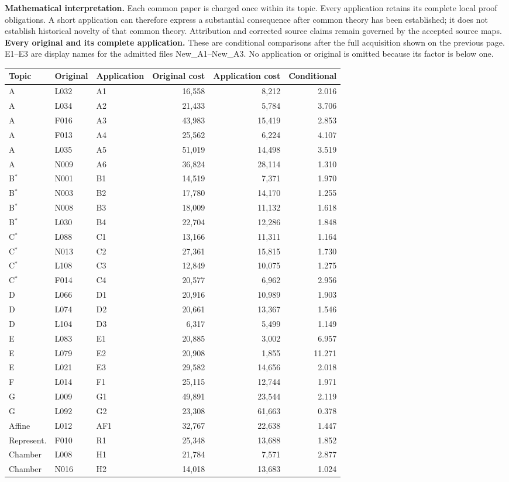 \documentclass[11pt,a4paper]{article}
\newcommand{\smalltable}{\small\setlength{\tabcolsep}{5pt}\renewcommand{\arraystretch}{1.13}}
\begin{document}
\textbf{Mathematical interpretation.} Each common paper is charged once within its topic. Every application retains its complete local proof obligations. A short application can therefore express a substantial consequence after common theory has been established; it does not establish historical novelty of that common theory. Attribution and corrected source claims remain governed by the accepted source maps.
\newpage
\textbf{Every original and its complete application.} These are conditional comparisons after the full acquisition shown on the previous page. E1--E3 are display names for the admitted files New\_A1--New\_A3. No application or original is omitted because its factor is below one.
\begin{center}\smalltable
\begin{tabular}{lllrrr}\toprule
Topic & Original & Application & Original cost & Application cost & Conditional\\\midrule
A & L032 & A1 & 16,558 & 8,212 & 2.016 \\
A & L034 & A2 & 21,433 & 5,784 & 3.706 \\
A & F016 & A3 & 43,983 & 15,419 & 2.853 \\
A & F013 & A4 & 25,562 & 6,224 & 4.107 \\
A & L035 & A5 & 51,019 & 14,498 & 3.519 \\
A & N009 & A6 & 36,824 & 28,114 & 1.310 \\
B$^*$ & N001 & B1 & 14,519 & 7,371 & 1.970 \\
B$^*$ & N003 & B2 & 17,780 & 14,170 & 1.255 \\
B$^*$ & N008 & B3 & 18,009 & 11,132 & 1.618 \\
B$^*$ & L030 & B4 & 22,704 & 12,286 & 1.848 \\
C$^*$ & L088 & C1 & 13,166 & 11,311 & 1.164 \\
C$^*$ & N013 & C2 & 27,361 & 15,815 & 1.730 \\
C$^*$ & L108 & C3 & 12,849 & 10,075 & 1.275 \\
C$^*$ & F014 & C4 & 20,577 & 6,962 & 2.956 \\
D & L066 & D1 & 20,916 & 10,989 & 1.903 \\
D & L074 & D2 & 20,661 & 13,367 & 1.546 \\
D & L104 & D3 & 6,317 & 5,499 & 1.149 \\
E & L083 & E1 & 20,885 & 3,002 & 6.957 \\
E & L079 & E2 & 20,908 & 1,855 & 11.271 \\
E & L021 & E3 & 29,582 & 14,656 & 2.018 \\
F & L014 & F1 & 25,115 & 12,744 & 1.971 \\
G & L009 & G1 & 49,891 & 23,544 & 2.119 \\
G & L092 & G2 & 23,308 & 61,663 & 0.378 \\
Affine & L012 & AF1 & 32,767 & 22,638 & 1.447 \\
Represent. & F010 & R1 & 25,348 & 13,688 & 1.852 \\
Chamber & L008 & H1 & 21,784 & 7,571 & 2.877 \\
Chamber & N016 & H2 & 14,018 & 13,683 & 1.024 \\
\bottomrule\end{tabular}\end{center}
\end{document}
